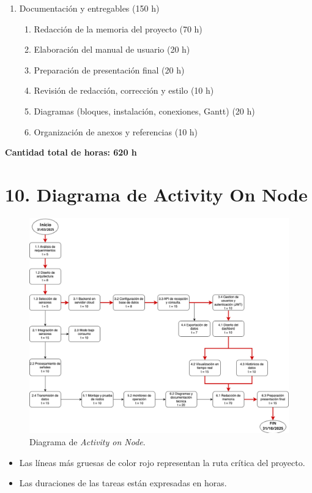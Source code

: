 \documentclass[
11pt, %
]{charter}
\begin{document}
\begin{enumerate}
    \item Documentación y entregables (150 h)
    \begin{enumerate}
        \item Redacción de la memoria del proyecto (70 h) 
        \item Elaboración del manual de usuario (20 h) 
        \item Preparación de presentación final (20 h) 
        \item Revisión de redacción, corrección y estilo (10 h) 
        \item Diagramas (bloques, instalación, conexiones, Gantt) (20 h) 
        \item Organización de anexos y referencias (10 h) 
    \end{enumerate}
\end{enumerate}

\textbf{Cantidad total de horas: 620 h}

\newpage
\section{10. Diagrama de Activity On Node}
\label{sec:AoN}

\begin{figure}[htpb]
\centering 
\includegraphics[width=1.05\textwidth]{./Figuras/aon.png}
\caption{Diagrama de \textit{Activity on Node}.}
\label{fig:AoN}
\end{figure}
\begin{itemize}
    \item Las líneas más gruesas de color rojo representan la ruta crítica del proyecto.
    \item Las duraciones de las tareas están expresadas en horas.
\end{itemize}
\end{document}
